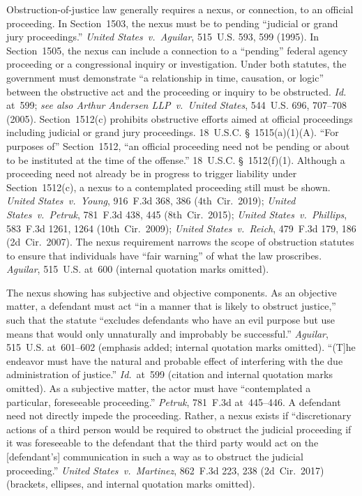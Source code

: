 Obstruction-of-justice law generally requires a nexus, or connection, to an official proceeding.
In Section~1503, the nexus must be to pending ``judicial or grand jury proceedings.''
\textit{United States~v.\ Aguilar}, 515~U.S. 593, 599 (1995).
In Section~1505, the nexus can include a connection to a ``pending'' federal agency proceeding or a congressional inquiry or investigation.
Under both statutes, the government must demonstrate ``a relationship in time, causation, or logic'' between the obstructive act and the proceeding or inquiry to be obstructed.
\textit{Id.} at~599; \textit{see also Arthur Andersen LLP~v.\ United States}, 544~U.S. 696, 707--708 (2005).
Section~1512(c) prohibits obstructive efforts aimed at official proceedings including judicial or grand jury proceedings.
18~U.S.C. \S~1515(a)(1)(A).
``For purposes of'' Section~1512, ``an official proceeding need not be pending or about to be instituted at the time of the offense.''
18~U.S.C. \S~1512(f)(1).
Although a proceeding need not already be in progress to trigger liability under Section~1512(c), a nexus to a contemplated proceeding still must be shown.
\textit{United States~v.\ Young}, 916~F.3d 368, 386 (4th~Cir.~2019);
\textit{United States~v.\ Petruk}, 781~F.3d 438, 445 (8th~Cir.~2015);
\textit{United States~v.\ Phillips}, 583~F.3d 1261, 1264 (10th~Cir.~2009);
\textit{United States~v.\ Reich}, 479~F.3d 179, 186 (2d~Cir.~2007).
The nexus requirement narrows the scope of obstruction statutes to ensure that individuals have ``fair warning'' of what the law proscribes.
\textit{Aguilar}, 515~U.S. at~600 (internal quotation marks omitted).

The nexus showing has subjective and objective components.
As an objective matter, a defendant must act ``in a manner that is likely to obstruct justice,'' such that the statute ``excludes defendants who have an evil purpose but use means that would only unnaturally and improbably be successful.''
\textit{Aguilar}, 515~U.S. at~601--602 (emphasis added; internal quotation marks omitted).
``(T]he endeavor must have the natural and probable effect of interfering with the due administration of justice.''
\textit{Id.}~at~599 (citation and internal quotation marks omitted).
As a subjective matter, the actor must have ``contemplated a particular, foreseeable proceeding.''
\textit{Petruk}, 781~F.3d at~445--446.
A defendant need not directly impede the proceeding.
Rather, a nexus exists if ``discretionary actions of a third person would be required to obstruct the judicial proceeding if it was foreseeable to the defendant that the third party would act on the [defendant's] communication in such a way as to obstruct the judicial proceeding.''
\textit{United States~v.\ Martinez}, 862~F.3d 223, 238 (2d~Cir.~2017) (brackets, ellipses, and internal quotation marks omitted).

